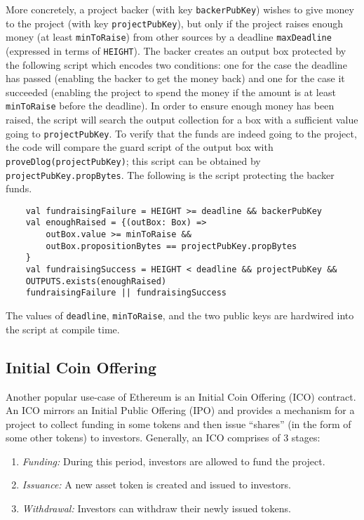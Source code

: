 \documentclass[runningheads]{llncs}
\begin{document}
More concretely, a project backer (with key \texttt{backerPubKey}) wishes to give money to the project (with key \texttt{projectPubKey}), but only if the project raises enough money (at least \texttt{minToRaise}) from other sources by a deadline \texttt{maxDeadline} (expressed in terms of \texttt{HEIGHT}). The backer creates an output box protected by the following script which encodes two conditions: one for the case the deadline has passed (enabling the
 backer to get the money back) and one for the case it succeeded (enabling the project to spend
 the money if the amount is at least \texttt{minToRaise} before the deadline). In order to ensure enough  money has been raised, the script will search the output collection for a box with a sufficient value going to \texttt{projectPubKey}. To verify that the funds are indeed going to the project, the code will compare the guard script of the output box with \texttt{proveDlog(projectPubKey)}; this script can be obtained by \texttt{projectPubKey.propBytes}. The following is the script protecting the backer funds.
\begin{verbatim}
    val fundraisingFailure = HEIGHT >= deadline && backerPubKey
    val enoughRaised = {(outBox: Box) =>
        outBox.value >= minToRaise &&
        outBox.propositionBytes == projectPubKey.propBytes
    }
    val fundraisingSuccess = HEIGHT < deadline && projectPubKey &&
    OUTPUTS.exists(enoughRaised)
    fundraisingFailure || fundraisingSuccess
\end{verbatim}

The values of \texttt{deadline}, \texttt{minToRaise}, and the two public keys are hardwired into the script at compile time.
 
\subsection{Initial Coin Offering}
\label{ico}

Another popular use-case of Ethereum is an Initial Coin Offering (ICO) contract. %
An ICO mirrors an Initial Public Offering (IPO) and provides a mechanism for a project to collect funding in some tokens and then issue ``shares'' (in the form of some other tokens) to investors. Generally, an ICO comprises of 3 stages:
\begin{enumerate}
	\item {\em Funding:} During this period, investors are allowed to fund the project.
	\item {\em Issuance:} A new asset token is created and issued to investors.
	\item {\em Withdrawal:} Investors can withdraw their newly issued tokens. 
\end{enumerate}
\end{document}
